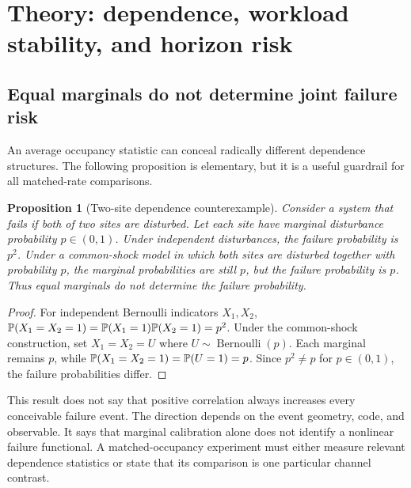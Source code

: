 \documentclass[11pt,a4paper,oneside]{article}
\newtheorem{proposition}{Proposition}[section]
\begin{document}
\section{Theory: dependence, workload stability, and horizon risk}
\label{sec:theory}
\subsection{Equal marginals do not determine joint failure risk}
An average occupancy statistic can conceal radically different dependence structures. The following proposition is elementary, but it is a useful guardrail for all matched-rate comparisons.

\begin{proposition}[Two-site dependence counterexample]\label{prop:dependence}
Consider a system that fails if both of two sites are disturbed. Let each site have marginal disturbance probability \(p\in(0,1)\). Under independent disturbances, the failure probability is \(p^2\). Under a common-shock model in which both sites are disturbed together with probability \(p\), the marginal probabilities are still \(p\), but the failure probability is \(p\). Thus equal marginals do not determine the failure probability.
\end{proposition}
\begin{proof}
For independent Bernoulli indicators \(X_1,X_2\), \(\mathbb{P}(X_1=X_2=1)=\mathbb{P}(X_1=1)\mathbb{P}(X_2=1)=p^2\). Under the common-shock construction, set \(X_1=X_2=U\) where \(U\sim\operatorname{Bernoulli}(p)\). Each marginal remains \(p\), while \(\mathbb{P}(X_1=X_2=1)=\mathbb{P}(U=1)=p\). Since \(p^2\ne p\) for \(p\in(0,1)\), the failure probabilities differ.\end{proof}

This result does not say that positive correlation always increases every conceivable failure event. The direction depends on the event geometry, code, and observable. It says that marginal calibration alone does not identify a nonlinear failure functional. A matched-occupancy experiment must either measure relevant dependence statistics or state that its comparison is one particular channel contrast.
\end{document}
